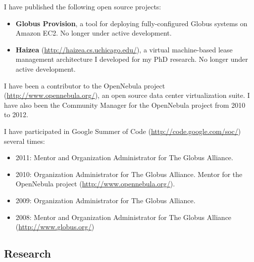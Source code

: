 \documentclass{resume}
\begin{document}
\begin{category}{}
\citembullet I have published the following open source projects:

\begin{itemize}
 \item \textbf{Globus Provision}, a tool for deploying fully-configured Globus systems on Amazon EC2. No longer under active development.
 \item \textbf{Haizea} (\url{http://haizea.cs.uchicago.edu/}), a virtual machine-based lease management architecture I developed for my PhD research. No longer under active development.
\end{itemize}

\citembullet I have been a contributor to the OpenNebula project (\url{http://www.opennebula.org/}), an open source data center virtualization suite. I have also been the Community Manager for the OpenNebula project from 2010 to 2012.

\citembullet I have participated in Google Summer of Code (\url{http://code.google.com/soc/}) several times:

\begin{itemize}
 \item 2011: Mentor and Organization Administrator for The Globus Alliance.
 \item 2010: Organization Administrator for The Globus Alliance. Mentor for the OpenNebula project (\url{http://www.opennebula.org/}).
 \item 2009: Organization Administrator for The Globus Alliance.
 \item 2008: Mentor and Organization Administrator for The Globus Alliance (\url{http://www.globus.org/})
\end{itemize}
\end{category}





\begin{center}
\section*{\huge Research}
\vspace{2ex}
\end{center}
\end{document}
